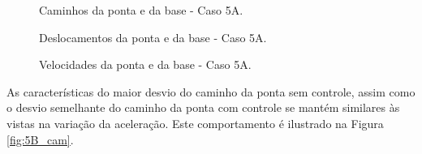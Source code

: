 \begin{figure}[H]
    \centering
    \hfill
    \hfill
    \hfill
    \caption{Caminhos da ponta e da base - Caso 5A.}
    \label{fig:5A_cam}
\end{figure}

\begin{figure}[H]
    \centering
    \hfill
    \caption{Deslocamentos da ponta e da base - Caso 5A.}
    \label{fig:5A_des}
\end{figure}

\begin{figure}[H]
    \centering
    \hfill
    \caption{Velocidades da ponta e da base - Caso 5A.}
    \label{fig:5A_vel}
\end{figure}

As características do maior desvio do caminho da ponta sem controle, assim como o desvio semelhante do caminho da ponta com controle se mantém similares às vistas na variação da aceleração.
Este comportamento é ilustrado na Figura \ref{fig:5B_cam}.

